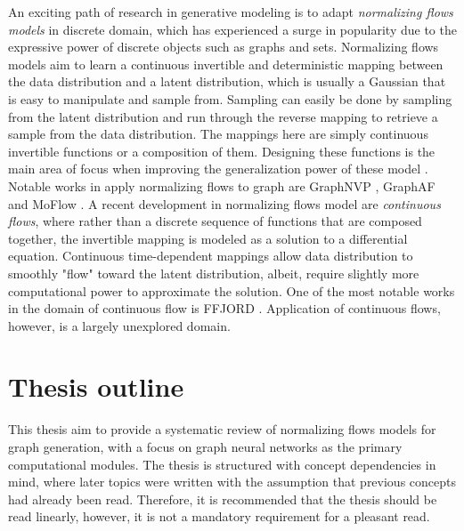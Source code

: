 An exciting path of research in generative modeling is to adapt
\textit{normalizing flows models} in discrete domain, which has experienced a
surge in popularity due to the expressive power of discrete objects such as
graphs and sets. Normalizing flows models aim to learn a continuous invertible
and deterministic mapping between the data distribution and a latent
distribution, which is usually a Gaussian that is easy to manipulate and sample
from. Sampling can easily be done by sampling from the latent distribution and
run through the reverse mapping to retrieve a sample from the data distribution.
The mappings here are simply continuous invertible functions or a composition of
them. Designing these functions is the main area of focus when improving the
generalization power of these model
\cite{kobyzevNormalizingFlowsIntroduction2021}. Notable works in apply
normalizing flows to graph are GraphNVP
\cite{madhawaGraphNVPInvertibleFlow2019}, GraphAF
\cite{shiGraphAFFlowbasedAutoregressive2020} and MoFlow
\cite{zangMoFlowInvertibleFlow2020}. A recent development in normalizing flows
model are \textit{continuous flows}, where rather than a discrete sequence of
functions that are composed together, the invertible mapping is modeled as a
solution to a differential equation. Continuous time-dependent mappings allow
data distribution to smoothly "flow" toward the latent distribution, albeit,
require slightly more computational power to approximate the solution. One of
the most notable works in the domain of continuous flow is FFJORD
\cite{grathwohlFFJORDFreeformContinuous2018}. Application of continuous flows,
however, is a largely unexplored domain.

\section{Thesis outline}

This thesis aim to provide a systematic review of normalizing flows models for
graph generation, with a focus on graph neural networks as the primary
computational modules. The thesis is structured with concept dependencies in
mind, where later topics were written with the assumption that previous concepts
had already been read. Therefore, it is recommended that the thesis should be
read linearly, however, it is not a mandatory requirement for a pleasant read.


